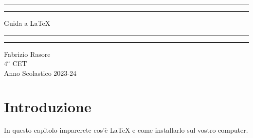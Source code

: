 \documentclass[12pt, oneside, openany, a4paper]{book}
\begin{document}
	\begin{titlepage}
		\centering %
		\scshape %
		\vspace*{1.5\baselineskip} %
		\rule{13cm}{1.6pt}\vspace*{-\baselineskip}\vspace*{2pt} %
		\rule{13cm}{0.4pt} %
		
		\vspace{0.75\baselineskip} %
		{	\Huge Guida a \LaTeX\\ }
		\vspace{0.75\baselineskip} %
		\rule{13cm}{0.4pt}\vspace*{-\baselineskip}\vspace{3.2pt} %
		\rule{13cm}{1.6pt} %
		
		\vspace{1.75\baselineskip} %
		{
			\Large Fabrizio Rasore \\
			\vspace*{1.2\baselineskip}
			$4^a$ CET\\
			\vspace*{1.2\baselineskip}
			Anno Scolastico 2023-24
		}
		\vfill
	\end{titlepage}
	\tableofcontents
	\vfill
	\newpage
	\chapter{Introduzione}
	In questo capitolo imparerete cos'è LaTeX e come installarlo sul vostro computer.
\end{document}
